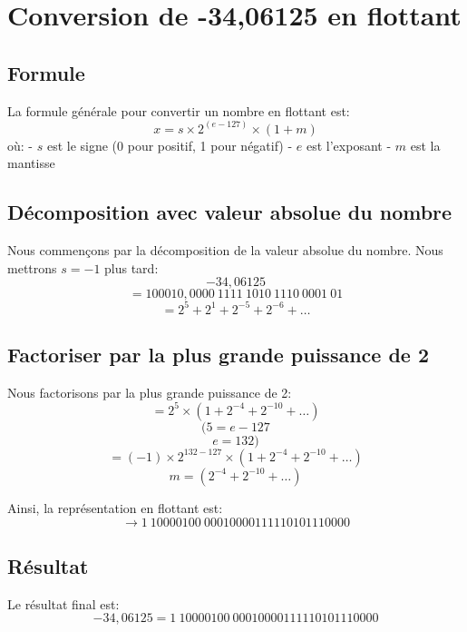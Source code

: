 \documentclass[titlepage]{article}
\begin{document}
\section{Conversion de -34,06125 en flottant}

\subsection{Formule}

La formule générale pour convertir un nombre en flottant est:
\[ 
x = s \times 2^{(e-127)} \times (1+m) 
\]
où:
- \( s \) est le signe (0 pour positif, 1 pour négatif)
- \( e \) est l'exposant
- \( m \) est la mantisse

\subsection{Décomposition avec valeur absolue du nombre}

Nous commençons par la décomposition de la valeur absolue du nombre. Nous mettrons \( s = -1 \) plus tard:
\[ 
-34,06125 
\]
\[ 
= 100010,0000 \ 1111 \ 1010 \ 1110 \ 0001 \ 01 
\]
\[ 
= 2^5 + 2^1 + 2^{-5} + 2^{-6} + \ldots 
\]

\subsection{Factoriser par la plus grande puissance de 2}

Nous factorisons par la plus grande puissance de 2:
\[ 
= 2^5 \times (1 + 2^{-4} + 2^{-10} + \ldots) 
\]
\[ 
(5 = e - 127 
\]
\[ 
e = 132) 
\]
\[ 
= (-1) \times 2^{132-127} \times (1 + 2^{-4} + 2^{-10} + \ldots) 
\]
\[ 
m = (2^{-4} + 2^{-10} + \ldots) 
\]

Ainsi, la représentation en flottant est:
\[ 
\rightarrow 1 \ 10000100 \ 00010000111110101110000 
\]

\subsection{Résultat}

Le résultat final est:
\[ 
-34,06125 = 1 \ 10000100 \ 00010000111110101110000 
\]
\end{document}
